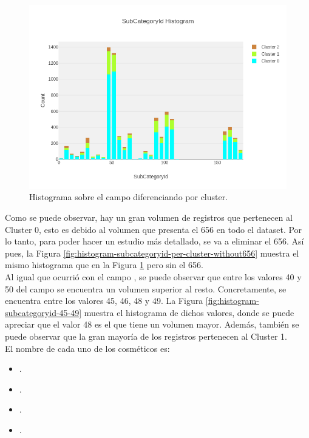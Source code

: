 \begin{figure}[!th]
\includegraphics[scale=0.5]{figures/histogram-subcategoryid-per-cluster}
\centering
\caption{Histograma sobre el campo  diferenciando por cluster.}
\label{fig:histogram-subcategoryid-per-cluster}
\end{figure}

Como se puede observar, hay un gran volumen de registros que pertenecen al Cluster 0, esto es debido al volumen que presenta el  656 en todo el dataset. Por lo tanto, para poder hacer un estudio más detallado, se va a eliminar el  656. Así pues, la Figura \ref{fig:histogram-subcategoryid-per-cluster-without656} muestra el mismo histograma que en la Figura \ref{fig:histogram-subcategoryid-per-cluster} pero sin el  656. \\

Al igual que ocurrió con el campo , se puede observar que entre los valores 40 y 50 del campo  se encuentra un volumen superior al resto. Concretamente, se encuentra entre los valores 45, 46, 48 y 49. La Figura \ref{fig:histogram-subcategoryid-45-49} muestra el histograma de dichos valores, donde se puede apreciar que el valor  48 es el que tiene un volumen mayor. Además, también se puede observar que la gran mayoría de los registros pertenecen al Cluster 1. \\

El nombre de cada uno de los cosméticos es:

\begin{itemize}
 \item {}.
 \item {}.
 \item {}.
 \item {}.
\end{itemize}

